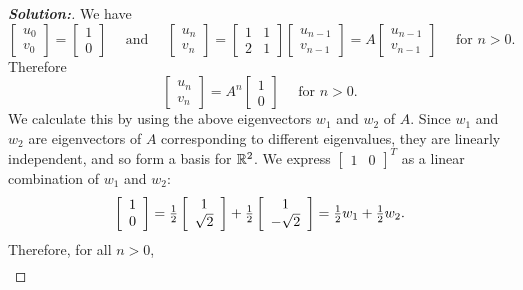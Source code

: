 \documentclass[a4paper]{amsart}
\theoremstyle{definition}
\newenvironment{solution}{\begin{proof}[\textbf{Solution:}] \vphantom{u}}{\end{proof}}
\begin{document}
\begin{solution}
 We have
 $$
 \left[ \begin{array}{c}u_{0}\\ v_0 \end{array} \right] =
 \left[ \begin{array}{c}1\\ 0 \end{array} \right]
 \quad \mbox{~and~} \quad
 \left[ \begin{array}{c}u_{n}\\ v_{n} \end{array} \right] =
 \left[ \begin{array}{cc} 1 & 1 \\ 2 & 1 \end{array} \right]
 \left[ \begin{array}{c}u_{n-1}\\ v_{n-1} \end{array} \right] =
 A\left[ \begin{array}{c}u_{n-1}\\ v_{n-1} \end{array} \right]
 \quad\textrm{\ for\ } n>0.
 $$
 Therefore
 $$
 \left[ \begin{array}{c}u_{n}\\ v_{n} \end{array} \right] =
 A^{n} \left[\begin{array}{c}1\\ 0 \end{array} \right]
 \quad\textrm{\ for\ } n>0.
 $$
 We calculate this by using the above eigenvectors $w_1$ and $w_2$ of
 $A$. Since $w_1$ and $w_2$ are eigenvectors of $A$ corresponding to
 different eigenvalues, they are linearly independent, and so form a
 basis for ${\mathbb{R}}^2$.
 We express
 $\left[ \begin{array}{cc}1&0 \end{array} \right]^T$
 as a linear combination of $w_1$ and $w_2$:
 $$
 \left[ \begin{array}{c}1\\ 0 \end{array} \right] =
 {\textstyle \tfrac{1}{2} \left[ \begin{array}{c}1\\ \sqrt{2} \end{array} \right] +
 \tfrac{1}{2} \left[ \begin{array}{c}1\\ -\sqrt{2} \end{array} \right] =
 \tfrac{1}{2} w_1 + \tfrac{1}{2} w_2}.
 $$
 Therefore, for all $n > 0$,
 \begin{align*}

\end{align*}
\end{solution}
\end{document}
